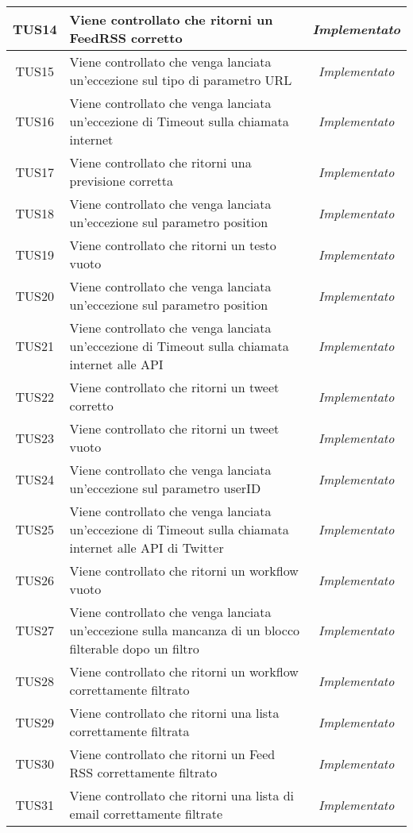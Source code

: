 \begin{longtable}{|c|m{12em}|c|}
TUS14 & Viene controllato che ritorni un FeedRSS corretto & \textit{Implementato}\\ \hline
TUS15 & Viene controllato che venga lanciata un'eccezione sul tipo di parametro URL & \textit{Implementato}\\ \hline
TUS16 & Viene controllato che venga lanciata un'eccezione di Timeout sulla chiamata internet & \textit{Implementato}\\ \hline
TUS17 & Viene controllato che ritorni una previsione corretta & \textit{Implementato}\\ \hline
TUS18 & Viene controllato che venga lanciata un'eccezione sul parametro position & \textit{Implementato}\\ \hline
TUS19 & Viene controllato che ritorni un testo vuoto & \textit{Implementato}\\ \hline
TUS20 & Viene controllato che venga lanciata un'eccezione sul parametro position & \textit{Implementato}\\ \hline
TUS21 & Viene controllato che venga lanciata un'eccezione di Timeout sulla chiamata internet alle API & \textit{Implementato}\\ \hline
TUS22 & Viene controllato che ritorni un tweet corretto & \textit{Implementato}\\ \hline
TUS23 & Viene controllato che ritorni un tweet vuoto & \textit{Implementato}\\ \hline
TUS24 & Viene controllato che venga lanciata un'eccezione sul parametro userID & \textit{Implementato}\\ \hline
TUS25 & Viene controllato che venga lanciata un'eccezione di Timeout sulla chiamata internet alle API di Twitter & \textit{Implementato}\\ \hline
TUS26 & Viene controllato che ritorni un workflow vuoto & \textit{Implementato}\\ \hline
TUS27 & Viene controllato che venga lanciata un'eccezione sulla mancanza di un blocco filterable dopo un filtro & \textit{Implementato}\\ \hline
TUS28 & Viene controllato che ritorni un workflow correttamente filtrato & \textit{Implementato}\\ \hline
TUS29 & Viene controllato che ritorni una lista correttamente filtrata & \textit{Implementato}\\ \hline
TUS30 & Viene controllato che ritorni un Feed RSS correttamente filtrato & \textit{Implementato}\\ \hline
TUS31 & Viene controllato che ritorni una lista di email correttamente filtrate & \textit{Implementato}\\ \hline

\end{longtable}
